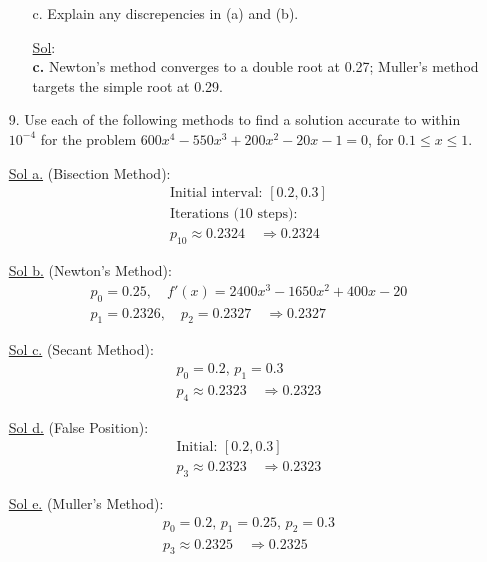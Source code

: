 \begin{enumerate}
\begin{enumerate}
      \item[c.] Explain any discrepencies in (a) and (b).

        \underline{Sol}:\\
        \textbf{c.} Newton's method converges to a double root at
        0.27; Muller's method targets the simple root at 0.29.
    \end{enumerate}

  \item[9.] Use each of the following methods to find a solution
    accurate to within \( 10^{-4} \) for the problem \( 600x^4 -
    550x^3 + 200x^2 - 20x - 1 = 0 \), for \( 0.1 \le x \le 1 \).

    \underline{Sol a.} (Bisection Method):
    \[
      \begin{array}{l}
        \text{Initial interval: } [0.2, 0.3] \\
        \text{Iterations (10 steps):} \\
        \hline
        p_{10} \approx 0.2324 \quad \Rightarrow \boxed{0.2324}
      \end{array}
    \]

    \underline{Sol b.} (Newton's Method):
    \[
      \begin{array}{l}
        p_0 = 0.25, \quad f'(x) = 2400x^3 - 1650x^2 + 400x - 20 \\
        p_1 = 0.2326, \quad p_2 = 0.2327 \quad \Rightarrow \boxed{0.2327}
      \end{array}
    \]

    \underline{Sol c.} (Secant Method):
    \[
      \begin{array}{l}
        p_0 = 0.2, \, p_1 = 0.3 \\
        p_4 \approx 0.2323 \quad \Rightarrow \boxed{0.2323}
      \end{array}
    \]

    \underline{Sol d.} (False Position):
    \[
      \begin{array}{l}
        \text{Initial: } [0.2, 0.3] \\
        p_3 \approx 0.2323 \quad \Rightarrow \boxed{0.2323}
      \end{array}
    \]

    \underline{Sol e.} (Muller's Method):
    \[
      \begin{array}{l}
        p_0 = 0.2, \, p_1 = 0.25, \, p_2 = 0.3 \\
        p_3 \approx 0.2325 \quad \Rightarrow \boxed{0.2325}
      \end{array}
    \]


\end{enumerate}
